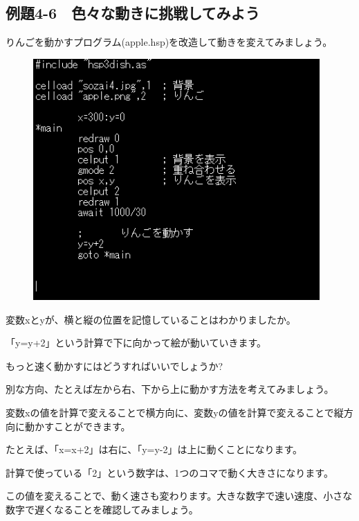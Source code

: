 \newpage
\subsection{例題4-6　色々な動きに挑戦してみよう}


\begin{description}
    \item {}
\end{description}

りんごを動かすプログラム(apple.hsp)を改造して動きを変えてみましょう。


\begin{figure}[H]
    \begin{center}
      \includegraphics[keepaspectratio,width=10.954cm,height=9.213cm]{text04-img/s_fallsrc.png}
    \end{center}
    \label{fig:prog_menu}
\end{figure}

変数xとyが、横と縦の位置を記憶していることはわかりましたか。

「y=y+2」という計算で下に向かって絵が動いていきます。

もっと速く動かすにはどうすればいいでしょうか?

別な方向、たとえば左から右、下から上に動かす方法を考えてみましょう。


\begin{description}
    \item {}
\end{description}



変数xの値を計算で変えることで横方向に、変数yの値を計算で変えることで縦方向に動かすことができます。

たとえば、「x=x+2」は右に、「y=y-2」は上に動くことになります。

計算で使っている「2」という数字は、1つのコマで動く大きさになります。

この値を変えることで、動く速さも変わります。大きな数字で速い速度、小さな数字で遅くなることを確認してみましょう。









